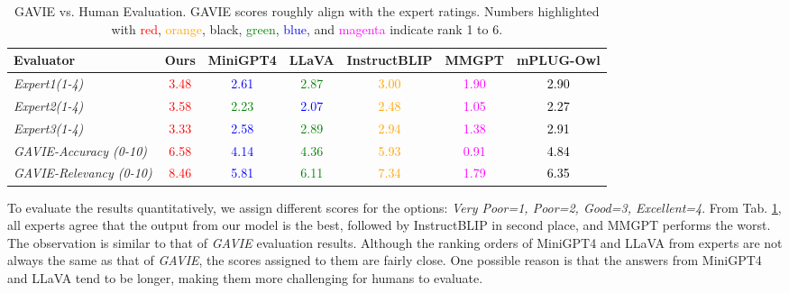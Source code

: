 \begin{table}[h]
\setlength\tabcolsep{3pt}
\centering
\small
\begin{tabular}{lcccccc}
\toprule[1.5pt]
Evaluator& Ours & MiniGPT4 & LLaVA & InstructBLIP & MMGPT & mPLUG-Owl\\
\midrule
\textit{Expert1(1-4)}& \textcolor{red}{3.48} & \textcolor{blue}{2.61} & \textcolor{green}{2.87} & \textcolor{orange}{3.00} & \textcolor{magenta}{1.90}&\textcolor{black}{2.90}\\
\textit{Expert2(1-4)} &\textcolor{red}{3.58}& \textcolor{green}{2.23}& \textcolor{blue}{2.07}& \textcolor{orange}{2.48}& \textcolor{magenta}{1.05}&\textcolor{black}{2.27}\\
\textit{Expert3(1-4)} & \textcolor{red}{3.33} & \textcolor{blue}{2.58} & \textcolor{green}{2.89} & \textcolor{orange}{2.94} & \textcolor{magenta}{1.38}&\textcolor{black}{2.91}\\
\midrule
\textit{GAVIE-Accuracy (0-10)} & \textcolor{red}{6.58} & \textcolor{blue}{4.14} & \textcolor{green}{4.36} & \textcolor{orange}{5.93} & \textcolor{magenta}{0.91}&\textcolor{black}{4.84}\\
\textit{GAVIE-Relevancy (0-10)}  & \textcolor{red}{8.46} & \textcolor{blue}{5.81} & \textcolor{green}{6.11} & \textcolor{orange}{7.34} & \textcolor{magenta}{1.79}&\textcolor{black}{6.35}\\
\bottomrule
\end{tabular}
\vspace{0.06in}
\caption{GAVIE vs. Human Evaluation. GAVIE scores roughly align with the expert ratings. Numbers highlighted with \textcolor{red}{red}, \textcolor{orange}{orange}, black, \textcolor{green}{green}, \textcolor{blue}{blue}, and \textcolor{magenta}{magenta} indicate rank 1 to 6.
}
\label{tab:appendix_human}
\vspace{-0.2in}
\end{table}

To evaluate the results quantitatively, we assign different scores for the options: \textit{Very Poor=1, Poor=2, Good=3, Excellent=4}. From Tab. \ref{tab:appendix_human}, all experts agree that the output from our model is the best, followed by InstructBLIP in second place, and MMGPT performs the worst. The observation is similar to that of \textit{GAVIE} evaluation results. Although the ranking orders of MiniGPT4 and LLaVA from experts are not always the same as that of \textit{GAVIE}, the scores assigned to them are fairly close. One possible reason is that the answers from MiniGPT4 and LLaVA tend to be longer, making them more challenging for humans to evaluate. 

